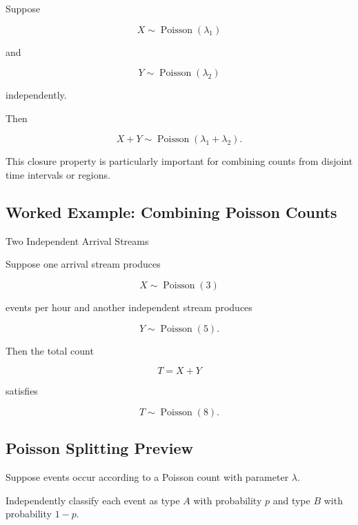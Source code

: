 Suppose

\[
X\sim\operatorname{Poisson}(\lambda_1)
\]

and

\[
Y\sim\operatorname{Poisson}(\lambda_2)
\]

independently.

Then

\[
\boxed{
X+Y
\sim
\operatorname{Poisson}(\lambda_1+\lambda_2).
}
\]

This closure property is particularly important for combining counts
from disjoint time intervals or regions.

\subsection{Worked Example: Combining Poisson Counts}
\label{subsec:worked-poisson-sum}

\begin{workedexamplebox}{Two Independent Arrival Streams}

Suppose one arrival stream produces

\[
X\sim\operatorname{Poisson}(3)
\]

events per hour and another independent stream produces

\[
Y\sim\operatorname{Poisson}(5).
\]

Then the total count

\[
T=X+Y
\]

satisfies

\begin{answerbox}
\[
\boxed{
T\sim\operatorname{Poisson}(8).
}
\]
\end{answerbox}

\end{workedexamplebox}

\subsection{Poisson Splitting Preview}
\label{subsec:poisson-splitting-preview}

Suppose events occur according to a Poisson count with parameter
\(\lambda\).

Independently classify each event as type \(A\) with probability \(p\)
and type \(B\) with probability \(1-p\).

